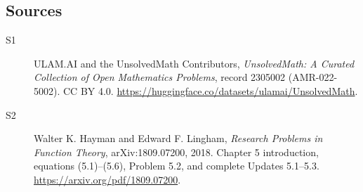 \documentclass[11pt]{book}
\begin{document}
\subsection{Sources}
\begin{description}
\item[\hypertarget{source:2305002:1}{S1}] ULAM.AI and the UnsolvedMath Contributors, \emph{UnsolvedMath: A Curated Collection of Open Mathematics Problems}, record 2305002 (AMR-022-5002). CC BY 4.0. \url{https://huggingface.co/datasets/ulamai/UnsolvedMath}.
\item[\hypertarget{source:2305002:2}{S2}] Walter K. Hayman and Edward F. Lingham, \emph{Research Problems in Function Theory}, arXiv:1809.07200, 2018. Chapter 5 introduction, equations (5.1)--(5.6), Problem 5.2, and complete Updates 5.1--5.3. \url{https://arxiv.org/pdf/1809.07200}.
\end{description}
\label{end:2305002}
\end{document}
